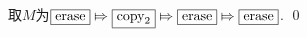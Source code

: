 \begin{pf} \rm 
    取$M$为$\boxed{\textrm{erase}} \Mapsto \boxed{\textrm{copy}_2} \Mapsto \boxed{\textrm{erase}}\Mapsto \boxed{\textrm{erase}} $.
    \qed
\end{pf}